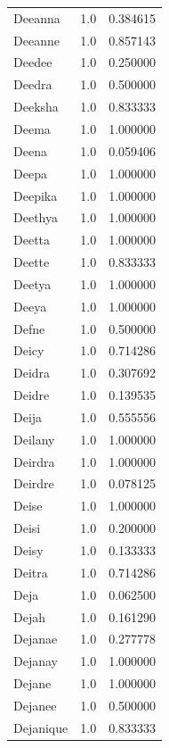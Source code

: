 \documentclass[
  letterpaper,
  DIV=11,
  numbers=noendperiod]{scrreprt}
\begin{document}
\begin{tabular}{lrr}
Deeanna         &   1.0 &   0.384615 \\
Deeanne         &   1.0 &   0.857143 \\
Deedee          &   1.0 &   0.250000 \\
Deedra          &   1.0 &   0.500000 \\
Deeksha         &   1.0 &   0.833333 \\
Deema           &   1.0 &   1.000000 \\
Deena           &   1.0 &   0.059406 \\
Deepa           &   1.0 &   1.000000 \\
Deepika         &   1.0 &   1.000000 \\
Deethya         &   1.0 &   1.000000 \\
Deetta          &   1.0 &   1.000000 \\
Deette          &   1.0 &   0.833333 \\
Deetya          &   1.0 &   1.000000 \\
Deeya           &   1.0 &   1.000000 \\
Defne           &   1.0 &   0.500000 \\
Deicy           &   1.0 &   0.714286 \\
Deidra          &   1.0 &   0.307692 \\
Deidre          &   1.0 &   0.139535 \\
Deija           &   1.0 &   0.555556 \\
Deilany         &   1.0 &   1.000000 \\
Deirdra         &   1.0 &   1.000000 \\
Deirdre         &   1.0 &   0.078125 \\
Deise           &   1.0 &   1.000000 \\
Deisi           &   1.0 &   0.200000 \\
Deisy           &   1.0 &   0.133333 \\
Deitra          &   1.0 &   0.714286 \\
Deja            &   1.0 &   0.062500 \\
Dejah           &   1.0 &   0.161290 \\
Dejanae         &   1.0 &   0.277778 \\
Dejanay         &   1.0 &   1.000000 \\
Dejane          &   1.0 &   1.000000 \\
Dejanee         &   1.0 &   0.500000 \\
Dejanique       &   1.0 &   0.833333 \\

\end{tabular}
\end{document}
